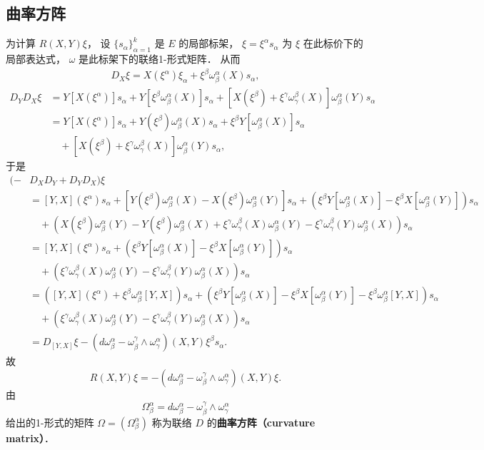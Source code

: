 \subsection{曲率方阵}
为计算 $R(X,Y)\xi$， 设 $\{s_\alpha\}_{\alpha=1}^k$ 是 $E$ 的局部标架， $\xi=\xi^\alpha s_\alpha$ 为 $\xi$ 在此标价下的局部表达式， $\omega$ 是此标架下的联络1-形式矩阵． 从而
$$
\begin{aligned}
D_X\xi=X(\xi^\alpha)\xi_\alpha+\xi^\beta\omega_\beta^\alpha(X) s_\alpha,
\end{aligned}
$$
$$
\begin{aligned}
D_YD_X\xi&=Y[X(\xi^\alpha)]s_\alpha+Y[\xi^\beta\omega_\beta^\alpha(X)] s_\alpha
+[X(\xi^\beta)+\xi^\gamma\omega_\gamma^\beta(X)]\omega_\beta^\alpha(Y) s_\alpha \\
&=Y[X(\xi^\alpha)]s_\alpha+Y(\xi^\beta)\omega_\beta^\alpha(X)s_\alpha+\xi^\beta Y[\omega_\beta^\alpha(X)]s_\alpha\\
&\quad+[X(\xi^\beta)+\xi^\gamma\omega_\gamma^\beta(X)]\omega_\beta^\alpha(Y) s_\alpha ,
\end{aligned}
$$
于是
$$
\begin{aligned}
(-&D_XD_Y+D_YD_X)\xi\\
&=[Y,X](\xi^\alpha)s_\alpha
+[Y(\xi^\beta)\omega_\beta^\alpha(X)-X(\xi^\beta)\omega_\beta^\alpha(Y)]s_\alpha+\left(\xi^\beta Y[\omega_\beta^\alpha(X)]-\xi^\beta X[\omega_\beta^\alpha(Y)]\right)s_\alpha\\
&\quad+\left(X(\xi^\beta)\omega_\beta^\alpha(Y)-Y(\xi^\beta)\omega_\beta^\alpha(X)+\xi^\gamma\omega_\gamma^\beta(X)\omega_\beta^\alpha(Y)-\xi^\gamma\omega_\gamma^\beta(Y)\omega_\beta^\alpha(X) \right)s_\alpha\\
&=[Y,X](\xi^\alpha)s_\alpha+\left(\xi^\beta Y[\omega_\beta^\alpha(X)]-\xi^\beta X[\omega_\beta^\alpha(Y)]\right)s_\alpha\\
&\quad+\left(\xi^\gamma\omega_\gamma^\beta(X)\omega_\beta^\alpha(Y)-\xi^\gamma\omega_\gamma^\beta(Y)\omega_\beta^\alpha(X) \right)s_\alpha\\
&=\left([Y,X](\xi^\alpha)+\xi^\beta\omega_\beta^\alpha[Y,X]\right)s_\alpha
+\left(\xi^\beta Y[\omega_\beta^\alpha(X)]-\xi^\beta X[\omega_\beta^\alpha(Y)]-\xi^\beta\omega_\beta^\alpha[Y,X]\right)s_\alpha\\
&\quad+\left(\xi^\gamma\omega_\gamma^\beta(X)\omega_\beta^\alpha(Y)-\xi^\gamma\omega_\gamma^\beta(Y)\omega_\beta^\alpha(X) \right)s_\alpha\\
&=D_{[Y,X]}\xi-(d\omega_\beta^\alpha-\omega_\beta^\gamma\wedge\omega_\gamma^\alpha)(X,Y)\xi^\beta s_\alpha.
\end{aligned}
$$
故
$$
R(X,Y)\xi=-(d\omega_\beta^\alpha-\omega_\beta^\gamma\wedge\omega_\gamma^\alpha)(X,Y)\xi.
$$
由
$$
\Omega_\beta^\alpha=d\omega_\beta^\alpha-\omega_\beta^\gamma\wedge\omega_\gamma^\alpha
$$
给出的1-形式的矩阵 $\Omega=(\Omega_\beta^\alpha)$ 称为联络 $D$ 的\textbf{曲率方阵（curvature matrix）}． 

